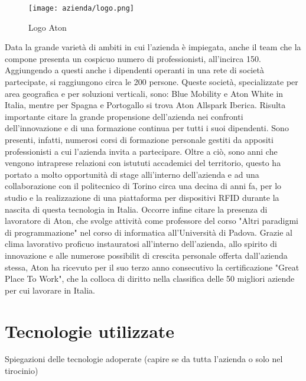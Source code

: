 \begin{figure}[!h] 
    \centering 
    \texttt{[image: azienda/logo.png]} 
    \caption{Logo Aton}
\end{figure}

Data la grande varietà di ambiti in cui l'azienda è impiegata, anche il team che la compone presenta un cospicuo numero di professionisti, all'incirca 150. 
Aggiungendo a questi anche i dipendenti operanti in una rete di società partecipate, si raggiungono circa le 200 persone. 
Queste società, specializzate per area geografica e per soluzioni verticali, sono: ​Blue Mobility e Aton White in Italia,
mentre per Spagna e Portogallo si trova Aton Allspark Iberica.
Risulta importante citare la grande propensione dell'azienda nei confronti dell'innovazione e di una formazione continua per tutti i suoi dipendenti.
Sono presenti, infatti, numerosi corsi di formazione personale gestiti da appositi professionisti a cui l'azienda invita a partecipare. Oltre a ciò,
sono anni che vengono intraprese relazioni con istututi accademici del territorio, questo ha portato a molto opportunità di stage alli'interno dell'azienda
e ad una collaborazione con il politecnico di Torino circa una decina di anni fa, per lo studio e la realizzazione di una piattaforma per dispositivi RFID
durante la nascita di questa tecnologia in Italia. Occorre infine citare la presenza di lavoratore di Aton, che svolge attività come professore del corso
"Altri paradigmi di programmazione" nel corso di informatica all'Università di Padova.
Grazie al clima lavorativo proficuo instauratosi all'interno dell'azienda, allo spirito di innovazione e alle numerose possibilit di crescita personale
offerta dall'azienda stessa, Aton ha ricevuto per il suo terzo anno consecutivo la certificazione "Great Place To Work", che la colloca di diritto
nella classifica delle 50 migliori aziende per cui lavorare in Italia.


\section{Tecnologie utilizzate}

Spiegazioni delle tecnologie adoperate (capire se da tutta l'azienda o solo nel tirocinio)


